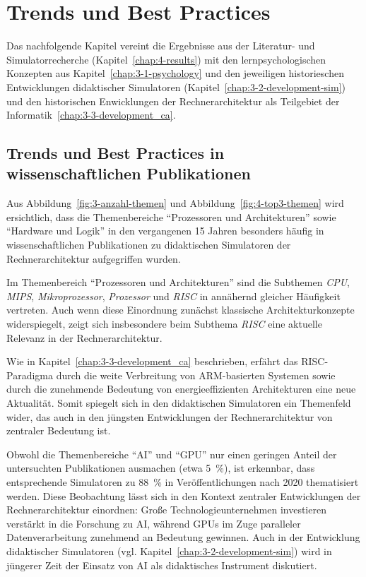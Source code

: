 \section{Trends und Best Practices}

Das nachfolgende Kapitel vereint die Ergebnisse aus der Literatur- und Simulatorrecherche (Kapitel~\ref{chap:4-results}) mit den lernpsychologischen Konzepten aus Kapitel~\ref{chap:3-1-psychology} und den jeweiligen historieschen Entwicklungen didaktischer Simulatoren (Kapitel~\ref{chap:3-2-development-sim}) und den historischen Enwicklungen der Rechnerarchitektur als Teilgebiet der Informatik~\ref{chap:3-3-development_ca}.

\subsection{Trends und Best Practices in wissenschaftlichen Publikationen}

Aus Abbildung~\ref{fig:3-anzahl-themen} und Abbildung~\ref{fig:4-top3-themen} wird ersichtlich, dass die Themenbereiche \enquote{Prozessoren und Architekturen} sowie \enquote{Hardware und Logik} in den vergangenen 15 Jahren besonders häufig in wissenschaftlichen Publikationen zu didaktischen Simulatoren der Rechnerarchitektur aufgegriffen wurden.  

Im Themenbereich \enquote{Prozessoren und Architekturen} sind die Subthemen \textit{CPU}, \textit{MIPS}, \textit{Mikroprozessor}, \textit{Prozessor} und \textit{RISC} in annähernd gleicher Häufigkeit vertreten. Auch wenn diese Einordnung zunächst klassische Architekturkonzepte widerspiegelt, zeigt sich insbesondere beim Subthema \textit{RISC} eine aktuelle Relevanz in der Rechnerarchitektur.  

Wie in Kapitel~\ref{chap:3-3-development_ca} beschrieben, erfährt das \ac{RISC}-Paradigma durch die weite Verbreitung von ARM-basierten Systemen sowie durch die zunehmende Bedeutung von energieeffizienten Architekturen eine neue Aktualität. Somit spiegelt sich in den didaktischen Simulatoren ein Themenfeld wider, das auch in den jüngsten Entwicklungen der Rechnerarchitektur von zentraler Bedeutung ist.

Obwohl die Themenbereiche \enquote{AI} und \enquote{GPU} nur einen geringen Anteil der untersuchten Publikationen ausmachen (etwa 5~\%), ist erkennbar, dass entsprechende Simulatoren zu 88~\% in Veröffentlichungen nach 2020 thematisiert werden. Diese Beobachtung lässt sich in den Kontext zentraler Entwicklungen der Rechnerarchitektur einordnen: Große Technologieunternehmen investieren verstärkt in die Forschung zu \ac{AI}, während GPUs im Zuge paralleler Datenverarbeitung zunehmend an Bedeutung gewinnen. Auch in der Entwicklung didaktischer Simulatoren (vgl. Kapitel~\ref{chap:3-2-development-sim}) wird in jüngerer Zeit der Einsatz von \ac{AI} als didaktisches Instrument diskutiert.

